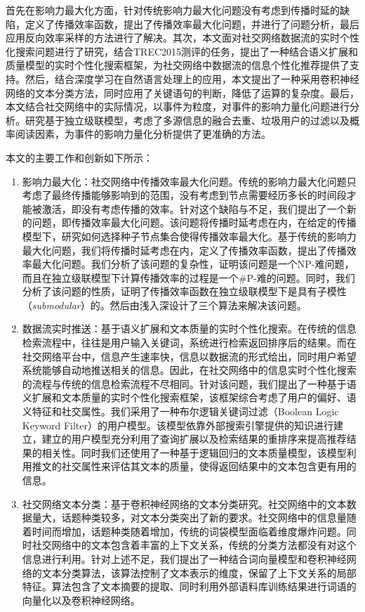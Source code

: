 首先在影响力最大化方面，针对传统影响力最大化问题没有考虑到传播时延的缺陷，定义了传播效率函数，提出了传播效率最大化问题，并进行了问题分析，最后应用反向效率采样的方法进行了解决。其次，本文面对社交网络数据流的实时个性化搜索问题进行了研究，结合TREC2015测评的任务，提出了一种结合语义扩展和质量模型的实时个性化搜索框架，为社交网络中数据流的信息个性化推荐提供了支持。然后，结合深度学习在自然语言处理上的应用，本文提出了一种采用卷积神经网络的文本分类方法，同时应用了关键语句的判断，降低了运算的复杂度。最后，本文结合社交网络中的实际情况，以事件为粒度，对事件的影响力量化问题进行分析。研究基于独立级联模型，考虑了多源信息的融合去重、垃圾用户的过滤以及概率阅读因素，为事件的影响力量化分析提供了更准确的方法。

本文的主要工作和创新如下所示：
\begin{enumerate}
	\item 影响力最大化：社交网络中传播效率最大化问题。传统的影响力最大化问题只考虑了最终传播能够影响到的范围，没有考虑到节点需要经历多长的时间段才能被激活，即没有考虑传播的效率。针对这个缺陷与不足，我们提出了一个新的问题，即传播效率最大化问题。该问题将传播时延考虑在内，在给定的传播模型下，研究如何选择种子节点集合使得传播效率最大化。基于传统的影响力最大化问题，我们将传播时延考虑在内，定义了传播效率函数，提出了传播效率最大化问题。我们分析了该问题的复杂性，证明该问题是一个NP-难问题，而且在独立级联模型下计算传播效率的过程是一个\#P-难的问题。同时，我们分析了该问题的性质，证明了传播效率函数在独立级联模型下是具有子模性（\textit{submodular}）的。然后由浅入深设计了三个算法来解决该问题。
	\item 数据流实时推送：基于语义扩展和文本质量的实时个性化搜索。在传统的信息检索流程中，往往是用户输入关键词，系统进行检索返回排序后的结果。而在社交网络平台中，信息产生速率快，信息以数据流的形式给出，同时用户希望系统能够自动地推送相关的信息。因此，在社交网络中的信息实时个性化搜索的流程与传统的信息检索流程不尽相同。针对该问题，我们提出了一种基于语义扩展和文本质量的实时个性化搜索框架，该框架综合考虑了用户的偏好、语义特征和社交属性。我们采用了一种布尔逻辑关键词过滤（Boolean Logic Keyword Filter）的用户模型。该模型依靠外部搜索引擎提供的知识进行建立，建立的用户模型充分利用了查询扩展以及检索结果的重排序来提高推荐结果的相关性。同时我们还使用了一种基于逻辑回归的文本质量模型，该模型利用推文的社交属性来评估其文本的质量，使得返回结果中的文本包含更有用的信息。
	\item 社交网络文本分类：基于卷积神经网络的文本分类研究。社交网络中的文本数据量大，话题种类较多，对文本分类突出了新的要求。社交网络中的信息量随着时间而增加，话题种类随着增加，传统的词袋模型面临着维度爆炸问题。同时社交网络中的文本包含着丰富的上下文关系，传统的分类方法都没有对这个信息进行利用。针对上述不足，我们提出了一种结合词向量模型和卷积神经网络的文本分类算法，该算法控制了文本表示的维度，保留了上下文关系的局部特征。算法包含了文本摘要的提取、同时利用外部语料库训练结果进行词语的向量化以及卷积神经网络。

\end{enumerate}
